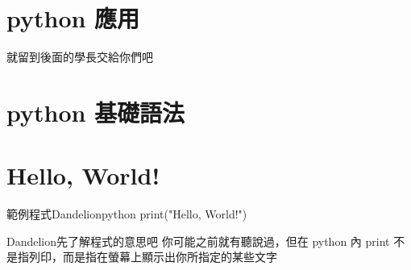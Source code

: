 \documentclass{article}
\begin{document}
\begin{large}
\section{python 應用}
就留到後面的學長交給你們吧

\section{python 基礎語法}
\section{Hello, World!}
\begin{mintbox}{範例程式}{Dandelion}{python}
print("Hello, World!")
\end{mintbox}

\begin{boxpar}{Dandelion}{先了解程式的意思吧}
    你可能之前就有聽說過，但在 python 內 print 不是指列印，而是指在螢幕上顯示出你所指定的某些文字
\end{boxpar}

\end{large}
\end{document}
